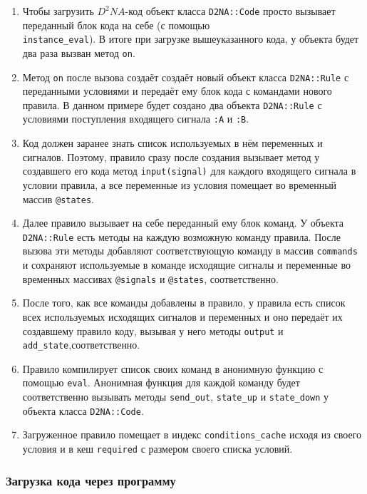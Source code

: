 \documentclass[utf8,a5paper,portrait,10pt,twoside]{eskdtext}
\begin{document}
\begin{enumerate}
  \item Чтобы загрузить $D^2NA$-код объект класса \texttt{D2NA::Code} просто
        вызывает переданный блок кода на себе (с помощью\\
        \texttt{instance\_eval}). В итоге при загрузке вышеуказанного кода, у
        объекта будет два раза вызван метод \texttt{on}.
  \item Метод \texttt{on} после вызова создаёт создаёт новый объект класса
        \texttt{D2NA::Rule} с переданными условиями и передаёт ему блок кода с
        командами нового правила. В данном примере будет создано два объекта
        \texttt{D2NA::Rule} с условиями поступления входящего сигнала
        \texttt{:A} и \texttt{:B}.
  \item Код должен заранее знать список используемых в нём переменных и
        сигналов. Поэтому, правило сразу после создания вызывает метод у
        создавшего его кода метод \texttt{input(signal)} для каждого входящего
        сигнала в условии правила, а все переменные из условия помещает во
        временный массив \texttt{@states}.
  \item Далее правило вызывает на себе переданный ему блок команд. У объекта
        \texttt{D2NA::Rule} есть методы на каждую возможную команду правила.
        После вызова эти методы добавляют соответствующую команду в массив
        \texttt{commands} и сохраняют используемые в команде исходящие сигналы и
        переменные во временных массивах \texttt{@signals} и \texttt{@states},
        соответственно.
  \item После того, как все команды добавлены в правило, у правила есть список
        всех используемых исходящих сигналов и переменных и оно передаёт их
        создавшему правило коду, вызывая у него методы \texttt{output} и
        \texttt{add\_state},соответственно.
  \item Правило компилирует список своих команд в анонимную функцию с помощью
        \texttt{eval}. Анонимная функция для каждой команду будет соответственно
        вызывать методы \texttt{send\_out}, \texttt{state\_up} и
        \texttt{state\_down} у объекта класса \texttt{D2NA::Code}.
  \item Загруженное правило помещает в индекс \texttt{conditions\_cache} исходя
        из своего условия и в кеш \texttt{required} с размером своего списка
        условий.
\end{enumerate}

\subsubsection{Загрузка кода через программу}
\end{document}

